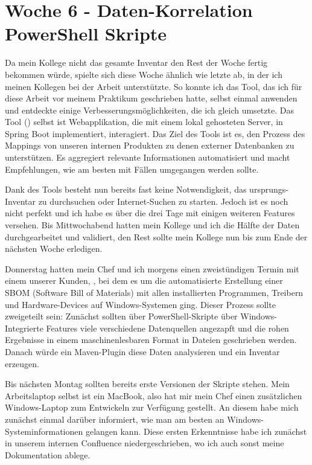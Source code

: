 \section{Woche 6 - Daten-Korrelation \headerand PowerShell Skripte} \label{sec:bericht-wo-6}


\lweekdaymarginpar{\weekdayMondayShort, \weekdayTuesdayShort, \weekdayWednesdayShort}

Da mein Kollege nicht das gesamte Inventar den Rest der Woche fertig bekommen würde, spielte sich diese Woche ähnlich wie letzte ab, in der ich meinen Kollegen bei der Arbeit unterstützte.
So konnte ich das Tool, das ich für diese Arbeit vor meinem Praktikum geschrieben hatte, selbst einmal anwenden und entdeckte einige Verbesserungsmöglichkeiten, die ich gleich umsetzte.
Das Tool () selbst ist Webapplikation, die mit einem lokal gehosteten Server, in Spring Boot implementiert, interagiert.
Das Ziel des Tools ist es, den Prozess des Mappings von unseren internen Produkten zu denen externer Datenbanken zu unterstützen.
Es aggregiert relevante Informationen automatisiert und macht Empfehlungen, wie am besten mit Fällen umgegangen werden sollte.

Dank des Tools besteht nun bereits fast keine Notwendigkeit, das ursprungs-Inventar zu durchsuchen oder Internet-Suchen zu starten.
Jedoch ist es noch nicht perfekt und ich habe es über die drei Tage mit einigen weiteren Features versehen.
Bis Mittwochabend hatten mein Kollege und ich die Hälfte der Daten durchgearbeitet und validiert, den Rest sollte mein Kollege nun bis zum Ende der nächsten Woche erledigen.

\sweekdaymarginpar{\weekdayThursdayLong}

Donnerstag hatten mein Chef und ich morgens einen zweistündigen Termin mit einem unserer Kunden, {\aeclientZEZESE}, bei dem es um die automatisierte Erstellung einer SBOM (Software Bill of Materials) mit allen installierten Programmen, Treibern und Hardware-Devices auf Windows-Systemen ging.
Dieser Prozess sollte zweigeteilt sein:
Zunächst sollten über PowerShell-Skripte über Windows-Integrierte Features viele verschiedene Datenquellen angezapft und die rohen Ergebnisse in einem maschinenlesbaren Format in Dateien geschrieben werden.
Danach würde ein Maven-Plugin diese Daten analysieren und ein Inventar erzeugen.

Bis nächsten Montag sollten bereits erste Versionen der Skripte stehen.
Mein Arbeitslaptop selbst ist ein MacBook, also hat mir mein Chef einen zusätzlichen Windows-Laptop zum Entwickeln zur Verfügung gestellt.
An diesem habe mich zunächst einmal darüber informiert, wie man am besten an Windows-Systeminformationen gelangen kann.
Diese ersten Erkenntnisse habe ich zunächst in unserem internen Confluence niedergeschrieben, wo ich auch sonst meine Dokumentation ablege.

